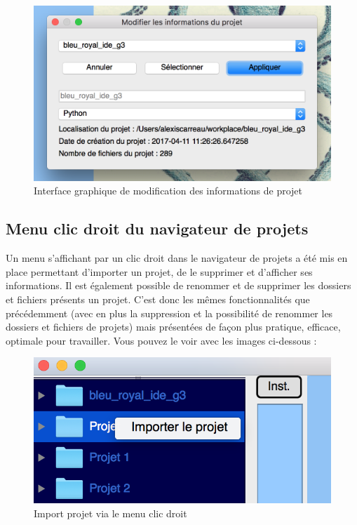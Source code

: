 \documentclass[a4paper,12pt]{article}
\begin{document}
\begin{figure}[h!]
			\begin{center}
				\includegraphics[scale=0.5]{images/imgs_projet/info_project3.png}
				\caption{Interface graphique de modification des informations de projet}
			\end{center}
		\end{figure}

\subsection{Menu clic droit du navigateur de projets}

Un menu s'affichant par un clic droit dans le navigateur de projets a été mis en place permettant d'importer un projet, de le supprimer et d'afficher ses informations. Il est également possible de renommer et de supprimer les dossiers et fichiers présents un projet. C'est donc les mêmes fonctionnalités que précédemment (avec en plus la suppression et la possibilité de renommer les dossiers et fichiers de projets) mais présentées de façon plus pratique, efficace, optimale pour travailler. Vous pouvez le voir avec les images ci-dessous :


\begin{figure}[h!]
			\begin{center}
				\includegraphics[scale=0.5]{images/imgs_projet/right_click_import.png}
				\caption{Import projet via le menu clic droit}
			\end{center}
		\end{figure}
		
\end{document}
